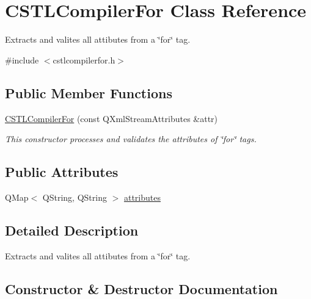 \hypertarget{class_c_s_t_l_compiler_for}{}\section{C\+S\+T\+L\+Compiler\+For Class Reference}
\label{class_c_s_t_l_compiler_for}


Extracts and valites all attibutes from a \char`\"{}for\char`\"{} tag.  




{\ttfamily \#include $<$cstlcompilerfor.\+h$>$}

\subsection*{Public Member Functions}
\begin{DoxyCompactItemize}
\item 
\hyperlink{class_c_s_t_l_compiler_for_aca7bad2177039289422199d9ea224ed9}{C\+S\+T\+L\+Compiler\+For} (const Q\+Xml\+Stream\+Attributes \&attr)
\begin{DoxyCompactList}\small\item\em This constructor processes and validates the attributes of \char`\"{}for\char`\"{} tags. \end{DoxyCompactList}\end{DoxyCompactItemize}
\subsection*{Public Attributes}
\begin{DoxyCompactItemize}
\item 
Q\+Map$<$ Q\+String, Q\+String $>$ \hyperlink{class_c_s_t_l_compiler_for_af3fc4b37c220af702aa93ea69b99cec6}{attributes}
\end{DoxyCompactItemize}


\subsection{Detailed Description}
Extracts and valites all attibutes from a \char`\"{}for\char`\"{} tag. 

\subsection{Constructor \& Destructor Documentation}
\mbox{\label{class_c_s_t_l_compiler_for_aca7bad2177039289422199d9ea224ed9}} 
